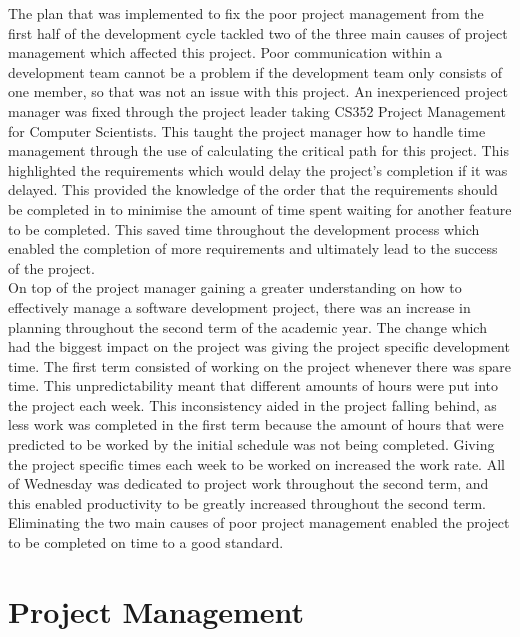 \documentclass{article}
\begin{document}
The plan that was implemented to fix the poor project management from the first half of the development cycle tackled two of the three main causes of project management which affected this project. Poor communication within a development team cannot be a problem if the development team only consists of one member, so that was not an issue with this project. An inexperienced project manager was fixed through the project leader taking CS352 Project Management for Computer Scientists. This taught the project manager how to handle time management through the use of calculating the critical path for this project. This highlighted the requirements which would delay the project's completion if it was delayed. This provided the knowledge of the order that the requirements should be completed in to minimise the amount of time spent waiting for another feature to be completed. This saved time throughout the development process which enabled the completion of more requirements and ultimately lead to the success of the project. \\ 

On top of the project manager gaining a greater understanding on how to effectively manage a software development project, there was an increase in planning throughout the second term of the academic year. The change which had the biggest impact on the project was giving the project specific development time. The first term consisted of working on the project whenever there was spare time. This unpredictability meant that different amounts of hours were put into the project each week. This inconsistency aided in the project falling behind, as less work was completed in the first term because the amount of hours that were predicted to be worked by the initial schedule was not being completed. Giving the project specific times each week to be worked on increased the work rate. All of Wednesday was dedicated to project work throughout the second term, and this enabled productivity to be greatly increased throughout the second term. \\

Eliminating the two main causes of poor project management enabled the project to be completed on time to a good standard. \\

\section{Project Management}
\label{section:projectManagement}
\end{document}
